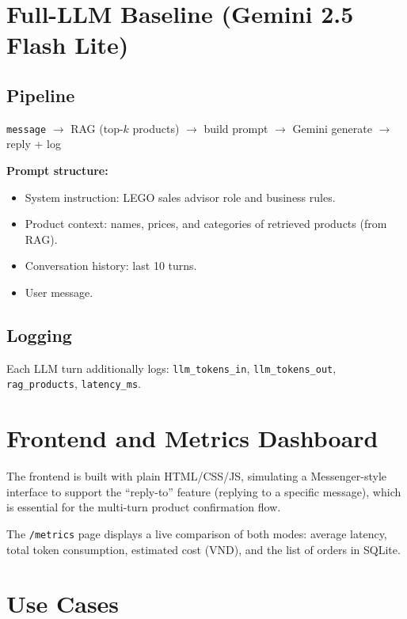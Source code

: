 \documentclass[12pt, a4paper]{report}
\begin{document}
\section{Full-LLM Baseline (Gemini 2.5 Flash Lite)}

\subsection{Pipeline}

\begin{center}
\texttt{message} $\rightarrow$ RAG (top-$k$ products) $\rightarrow$
build prompt $\rightarrow$ Gemini generate $\rightarrow$ reply + log
\end{center}

\textbf{Prompt structure:}
\begin{itemize}
  \item System instruction: LEGO sales advisor role and business rules.
  \item Product context: names, prices, and categories of retrieved products (from RAG).
  \item Conversation history: last 10 turns.
  \item User message.
\end{itemize}

\subsection{Logging}

Each LLM turn additionally logs:
\texttt{llm\_tokens\_in}, \texttt{llm\_tokens\_out},
\texttt{rag\_products}, \texttt{latency\_ms}.

\section{Frontend and Metrics Dashboard}

The frontend is built with plain HTML/CSS/JS, simulating a Messenger-style interface
to support the ``reply-to'' feature (replying to a specific message),
which is essential for the multi-turn product confirmation flow.

The \texttt{/metrics} page displays a live comparison of both modes:
average latency, total token consumption, estimated cost (VND),
and the list of orders in SQLite.

\section{Use Cases}
\label{sec:usecases}
\end{document}
